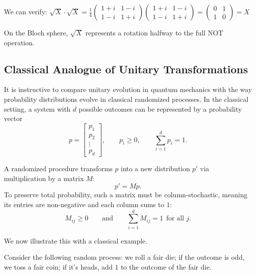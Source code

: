 \begin{proposition}
\begin{enumerate}
We can verify: $\sqrt{X} \cdot \sqrt{X} = \frac{1}{4}\begin{pmatrix} 1+i & 1-i \\ 1-i & 1+i \end{pmatrix}\begin{pmatrix} 1+i & 1-i \\ 1-i & 1+i \end{pmatrix} = \begin{pmatrix} 0 & 1 \\ 1 & 0 \end{pmatrix} = X$

On the Bloch sphere, $\sqrt{X}$ represents a rotation halfway to the full NOT operation.
\end{enumerate}
\end{proposition}


\subsection{Classical Analogue of Unitary Transformations}
It is instructive to compare unitary evolution in quantum mechanics with the way probability distributions evolve in classical randomized processes. In the classical setting, a system with $d$ possible outcomes can be represented by a probability vector
\[
p =
\begin{bmatrix}
p_1\\
p_2\\
\vdots\\
p_d
\end{bmatrix},
\qquad
p_i \ge 0,
\qquad
\sum_{i=1}^d p_i = 1.
\]

A randomized procedure transforms $p$ into a new distribution $p'$ via multiplication by a matrix $M$:
\[
p' = Mp.
\]
To preserve total probability, such a matrix must be column-stochastic, meaning its entries are non-negative and each column sums to $1$:
\[
M_{ij}\ge 0
\qquad\text{and}\qquad
\sum_{i=1}^d M_{ij} = 1 \ \ \text{for all } j.
\]

We now illustrate this with a classical example.

Consider the following random process: we roll a fair die; if the outcome is odd, we toss a fair coin; if it's heads, add $1$ to the outcome of the fair die.

